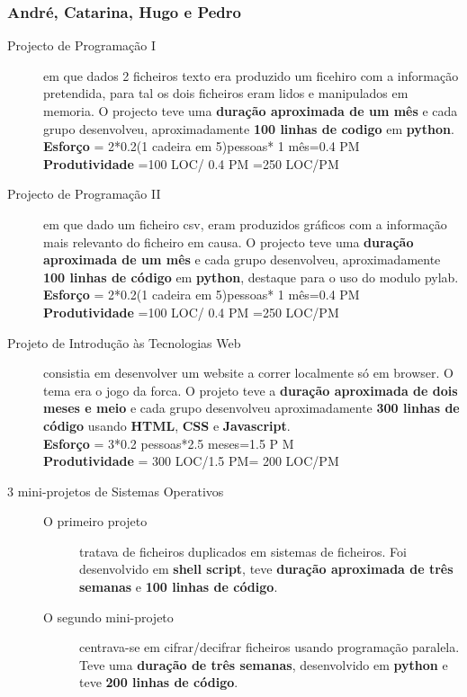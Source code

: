 \documentclass[a4paper]{report}
\begin{document}
\subsubsection*{André, Catarina, Hugo e Pedro} 
\begin{description}
\item[Projecto de Programação I] em que dados 2 ficheiros texto era produzido um ficehiro com a informação pretendida, para tal os dois ficheiros eram lidos e manipulados em memoria. O projecto teve uma \textbf{duração aproximada de um mês} e cada grupo desenvolveu, aproximadamente \textbf{100 linhas de codigo} em \textbf{python}.\\\textbf{Esforço} = 2*0.2(1 cadeira em 5)pessoas* 1 mês=0.4 PM\\ \textbf{Produtividade} =100 LOC/ 0.4 PM =250 LOC/PM

\item[Projecto de Programação II] em que dado um ficheiro csv, eram produzidos gráficos com a informação mais relevanto do ficheiro em causa. O projecto teve uma \textbf{duração aproximada de um mês} e cada grupo desenvolveu, aproximadamente \textbf{100 linhas de código} em \textbf{python}, destaque para o uso do modulo pylab.\\\textbf{Esforço} = 2*0.2(1 cadeira em 5)pessoas* 1 mês=0.4 PM\\ \textbf{Produtividade} =100 LOC/ 0.4 PM =250 LOC/PM

\item [Projeto de Introdução às Tecnologias Web] consistia em desenvolver um website a correr localmente só em browser. O tema era o jogo da forca. O projeto teve a \textbf{duração aproximada de dois meses e meio} e cada grupo desenvolveu aproximadamente \textbf{300 linhas de código} usando \textbf{HTML}, \textbf{CSS} e \textbf{Javascript}.\\\textbf{Esforço} = 3*0.2 pessoas*2.5 meses=1.5 P M\\ \textbf{Produtividade} = 300 LOC/1.5 PM= 200 LOC/PM

\item[3 mini-projetos de Sistemas Operativos]\mbox{}
	\begin{description}
		\item[O primeiro projeto] tratava de ficheiros duplicados em sistemas de ficheiros. Foi desenvolvido em \textbf{shell script}, teve \textbf{duração aproximada de três semanas} e \textbf{100 linhas de código}.		
		\item [O segundo mini-projeto] centrava-se em cifrar/decifrar ficheiros usando programação paralela. Teve uma \textbf{duração de três semanas}, desenvolvido em \textbf{python} e teve \textbf{200 linhas de código}.
		

\end{description}
\end{description}
\end{document}
